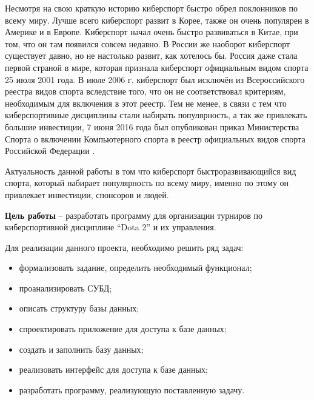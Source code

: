 Несмотря на свою краткую историю киберспорт быстро обрел поклонников по всему миру. Лучше всего киберспорт развит в Корее, также он очень популярен в Америке и в Европе. Киберспорт начал очень быстро развиваться в Китае, при том, что он там появился совсем недавно. В России же наоборот киберспорт существует давно, но не настолько развит, как хотелось бы. Россия даже стала первой страной в мире, которая признала киберспорт официальным видом спорта 25 июля 2001 года. В июле 2006 г. киберспорт был исключён из Всероссийского реестра видов спорта вследствие того, что он не соответствовал критериям, необходимым для включения в этот реестр. Тем не менее, в связи с тем что киберспортивные дисциплины стали набирать популярность, а так же привлекать большие инвестиции,  7 июня 2016 года был опубликован приказ Министерства Спорта о включении Компьютерного спорта в реестр официальных видов спорта Российской Федерации \cite{prikaz}. 

Актуальность данной работы в том что киберспорт быстроразвивающийся вид спорта, который набирает популярность по всему миру, именно по этому он привлекает инвестиции, спонсоров и людей. 

\textbf{Цель работы} – разработать программу для организации турниров по киберспортивной дисциплине “Dota 2” и их управления.

Для реализации данного проекта, необходимо решить ряд задач:
\begin{itemize}
	\item формализовать задание, определить необходимый функционал;
	\item проанализировать СУБД;
	\item описать структуру базы данных;
	\item спроектировать приложение для доступа к базе данных;
	\item создать и заполнить базу данных;
	\item реализовать интерфейс для доступа к базе данных;
	\item разработать программу, реализующую поставленную задачу.
\end{itemize}